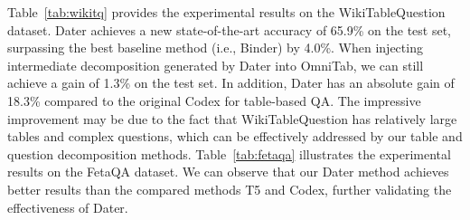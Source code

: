 Table~\ref{tab:wikitq} provides the experimental results on the WikiTableQuestion dataset. 
Dater achieves a new state-of-the-art accuracy of 65.9\% on the test set, surpassing the best baseline method (i.e., Binder) by 4.0\%.
When injecting intermediate decomposition generated by Dater into OmniTab, we can still achieve a gain of 1.3\% on the test set. 
In addition, Dater has an absolute gain of 18.3\% compared to the original Codex for table-based QA. The impressive improvement may be due to the fact that WikiTableQuestion has relatively large tables and complex questions, which can be effectively addressed by our table and question decomposition methods.
Table~\ref{tab:fetaqa} illustrates the experimental results on the FetaQA dataset.
We can observe that our Dater method achieves better results than the compared methods T5 and Codex, further validating the effectiveness of Dater.

\begin{table*}
    \centering
    \caption{Ablation results on the test sets of the three datasets.}
    \label{tab:main-ab}
\end{table*}

